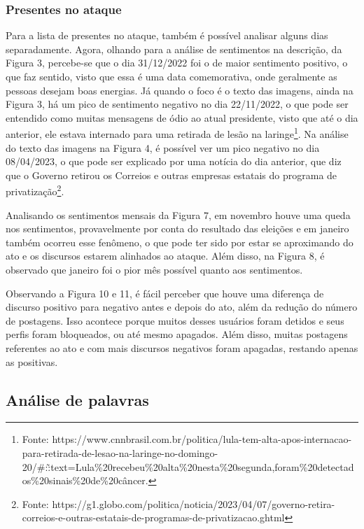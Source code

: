 \documentclass[manuscript,screen,review]{acmart}
\begin{document}
\subsubsection{Presentes no ataque}

Para a lista de presentes no ataque, também é possível analisar alguns dias separadamente. Agora, olhando para a análise de sentimentos na descrição, da Figura 3, percebe-se que o dia 31/12/2022 foi o de maior sentimento positivo, o que faz sentido, visto que essa é uma data comemorativa, onde geralmente as pessoas desejam boas energias. Já quando o foco é o texto das imagens, ainda na Figura 3, há um pico de sentimento negativo no dia 22/11/2022, o que pode ser entendido como muitas mensagens de ódio ao atual presidente, visto que até o dia anterior, ele estava internado para uma retirada de lesão na laringe\footnote{Fonte: https://www.cnnbrasil.com.br/politica/lula-tem-alta-apos-internacao-para-retirada-de-lesao-na-laringe-no-domingo-20/\#:\~:text=Lula\%20recebeu\%20alta\%20nesta\%20segunda,foram\%20detectados\%20sinais\%20de\%20câncer.}. Na análise do texto das imagens na Figura 4, é possível ver um pico negativo no dia 08/04/2023, o que pode ser explicado por uma notícia do dia anterior, que diz que o Governo retirou os Correios e outras empresas estatais do programa de privatização\footnote{Fonte: https://g1.globo.com/politica/noticia/2023/04/07/governo-retira-correios-e-outras-estatais-de-programas-de-privatizacao.ghtml}.

Analisando os sentimentos mensais da Figura 7, em novembro houve uma queda nos sentimentos, provavelmente por conta do resultado das eleições e em janeiro também ocorreu esse fenômeno, o que pode ter sido por estar se aproximando do ato e os discursos estarem alinhados ao ataque. Além disso, na Figura 8, é observado que janeiro foi o pior mês possível quanto aos sentimentos.

Observando a Figura 10 e 11, é fácil perceber que houve uma diferença de discurso positivo para negativo antes e depois do ato, além da redução do número de postagens. Isso acontece porque muitos desses usuários foram detidos e seus perfis foram bloqueados, ou até mesmo apagados. Além disso, muitas postagens referentes ao ato e com mais discursos negativos foram apagadas, restando apenas as positivas.

\subsection{Análise de palavras}
\end{document}

